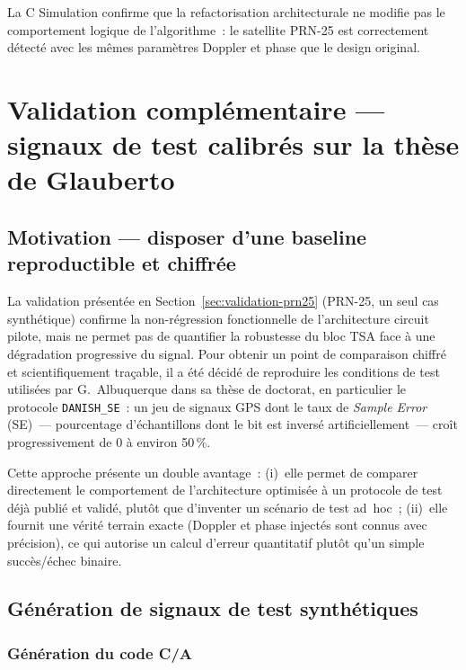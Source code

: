 \documentclass[11pt,a4paper]{article}
\providecommand{\og}{\guillemotleft{}}
\providecommand{\fg}{\guillemotright{}}
\begin{document}
La C Simulation confirme que la refactorisation architecturale ne modifie pas le comportement logique de l'algorithme~: le satellite PRN-25 est correctement détecté avec les mêmes paramètres Doppler et phase que le design original.

\section{Validation complémentaire --- signaux de test calibrés sur la thèse de Glauberto}
\label{sec:validation-danish}

\subsection{Motivation --- disposer d'une baseline reproductible et chiffrée}

La validation présentée en Section~\ref{sec:validation-prn25} (PRN-25, un seul cas synthétique) confirme la non-régression fonctionnelle de l'architecture circuit pilote, mais ne permet pas de quantifier la robustesse du bloc TSA face à une dégradation progressive du signal. Pour obtenir un point de comparaison chiffré et scientifiquement traçable, il a été décidé de reproduire les conditions de test utilisées par G.~Albuquerque dans sa thèse de doctorat, en particulier le protocole \texttt{DANISH\_SE}~: un jeu de signaux GPS dont le taux de \textit{Sample Error} (SE)~--- pourcentage d'échantillons dont le bit est inversé artificiellement~--- croît progressivement de 0 à environ 50\,\%.

Cette approche présente un double avantage~: (i)~elle permet de comparer directement le comportement de l'architecture optimisée à un protocole de test déjà publié et validé, plutôt que d'inventer un scénario de test ad~hoc~; (ii)~elle fournit une \og{}vérité terrain\fg{} exacte (Doppler et phase injectés sont connus avec précision), ce qui autorise un calcul d'erreur quantitatif plutôt qu'un simple succès/échec binaire.

\subsection{Génération de signaux de test synthétiques}

\subsubsection{Génération du code C/A}
\end{document}
